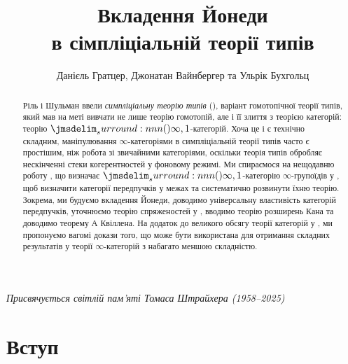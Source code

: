\documentclass[12pt]{article}
\newcommand{\textcite}{\cite}
\let\prn\DelimPrn
\begin{document}
\title{Вкладення Йонеди \\ в сімпліціальній теорії типів}
\author{Данієль Гратцер, Джонатан Вайнбергер та Ульрік Бухгольц}
\maketitle

\begin{abstract}
  Ріль і Шульман \textcite{riehl:2017} ввели \emph{симпліціальну теорію типів} (\STT), варіант гомотопічної теорії
  типів, який мав на меті вивчати не лише теорію гомотопій, але і її злиття з теорією категорій:
  теорію $\prn{\infty,1}$-категорій. Хоча це і є технічно складним, маніпулювання $\infty$-категоріями в
  симпліціальній теорії типів часто є простішим, ніж робота зі звичайними категоріями, оскільки теорія типів
  обробляє нескінченні стеки когерентностей у фоновому режимі. Ми спираємося на нещодавню роботу
  \textcite{gratzer:2024}, що визначає $\prn{\infty,1}$-категорію $\infty$-групоїдів у \STT{}, щоб
  визначити категорії передпучків у межах \STT{} та систематично розвинути їхню теорію. Зокрема,
  ми будуємо вкладення Йонеди, доводимо універсальну властивість категорій передпучків, уточнюємо
  теорію спряженостей у \STT{}, вводимо теорію розширень Кана та доводимо теорему А
  Квіллена. На додаток до великого обсягу теорії категорій у \STT{}, ми пропонуємо вагомі
  докази того, що \STT{} може бути використана для отримання складних результатів у теорії $\infty$-категорій з
  набагато меншою складністю.
\end{abstract}

\begin{center}
  \emph{Присвячується світлій пам'яті Томаса Штрайхера (1958--2025)}
\end{center}

\newpage
\section{Вступ}
\end{document}
